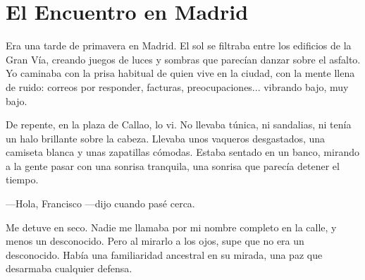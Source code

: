 \documentclass[12pt,twoside,openright]{book}
\begin{document}
\chapter{El Encuentro en Madrid}
Era una tarde de primavera en Madrid. El sol se filtraba entre los edificios de la Gran Vía, creando juegos de luces y sombras que parecían danzar sobre el asfalto. Yo caminaba con la prisa habitual de quien vive en la ciudad, con la mente llena de ruido: correos por responder, facturas, preocupaciones... vibrando bajo, muy bajo.

De repente, en la plaza de Callao, lo vi. No llevaba túnica, ni sandalias, ni tenía un halo brillante sobre la cabeza. Llevaba unos vaqueros desgastados, una camiseta blanca y unas zapatillas cómodas. Estaba sentado en un banco, mirando a la gente pasar con una sonrisa tranquila, una sonrisa que parecía detener el tiempo.

---Hola, Francisco ---dijo cuando pasé cerca.

Me detuve en seco. Nadie me llamaba por mi nombre completo en la calle, y menos un desconocido. Pero al mirarlo a los ojos, supe que no era un desconocido. Había una familiaridad ancestral en su mirada, una paz que desarmaba cualquier defensa.
\end{document}
